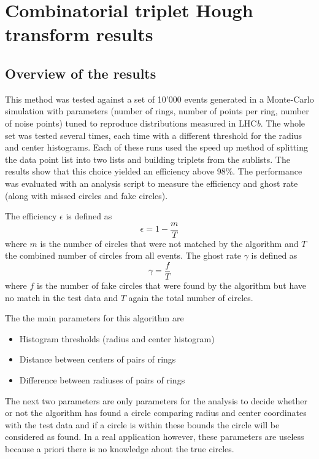 \documentclass[11pt]{scrreprt}
\begin{document}
\newpage
\section{Combinatorial triplet Hough transform results} %
\label{sec:combinatorial_approach_results}

\subsection{Overview of the results} %
\label{sub:overview_of_the_results}

This method was tested against a set of 10'000 events generated in a Monte-Carlo simulation with parameters (number of rings, 
number of points per ring, number of noise points) tuned to reproduce distributions measured in LHC\textit{b}. 
The whole set was tested several times, each time with a different threshold for the radius and center histograms. 
Each of these runs used the speed up method of splitting the data point list into two lists and building triplets from 
the sublists. The results show that this choice yielded an efficiency above $98\%$. 
The performance was evaluated with an analysis script to measure the efficiency and ghost rate (along with missed 
circles and fake circles).

The efficiency $\epsilon$ is defined as 
\begin{equation}
\epsilon = 1 - \frac{m}{T}    
\end{equation}
where $m$ is the number of circles that were not matched by the algorithm and $T$ the combined number of circles from
all events. The ghost rate $\gamma$ is defined as 
\begin{equation}
  \gamma = \frac{f}{T} 
\end{equation}
where $f$ is the number of fake circles that were found by the algorithm but have no match in the test data and $T$ again the
total number of circles.


The the main parameters for this algorithm are
\begin{itemize}
  \item Histogram thresholds (radius and center histogram)
  \item Distance between centers of pairs of rings
  \item Difference between radiuses of pairs of rings
\end{itemize}

The next two parameters are only parameters for the analysis to decide whether or not the algorithm has found a circle comparing radius
and center coordinates with the test data and if a circle is within these bounds the circle will be considered as found. In a real application
however, these parameters are useless because a priori there is no knowledge about the true circles.
\end{document}
